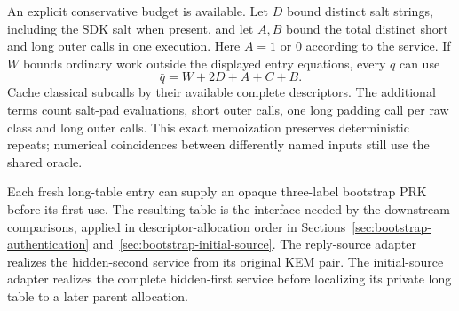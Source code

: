 An explicit conservative budget is available. Let $D$ bound distinct
salt strings, including the SDK salt when present, and let $A,B$ bound
the total distinct short and long outer calls in one execution. Here
$A=1$ or $0$ according to the service. If $W$ bounds ordinary work
outside the displayed entry equations, every $q$ can use
\[
 \bar q=W+2D+A+C+B.
\]
Cache classical subcalls by their available complete descriptors.
The additional terms count salt-pad evaluations, short outer calls,
one long padding call per raw class and long outer calls. This exact
memoization preserves deterministic repeats; numerical coincidences
between differently named inputs still use the shared oracle.

Each fresh long-table entry can supply an opaque three-label bootstrap PRK
before its first use. The resulting table is the interface needed by
the downstream comparisons, applied in descriptor-allocation order in
Sections~\ref{sec:bootstrap-authentication}
and~\ref{sec:bootstrap-initial-source}. The reply-source adapter realizes
the hidden-second service from its original KEM pair. The initial-source
adapter realizes the complete hidden-first service before localizing its
private long table to a later parent allocation.
